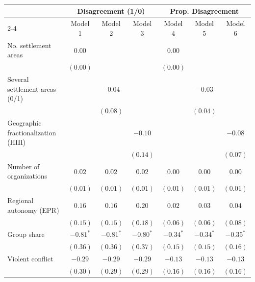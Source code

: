 
\begin{tabular}{l c c c c c c}
\hline
 & \multicolumn{3}{c}{Disagreement (1/0)} & \multicolumn{3}{c}{Prop. Disagreement} \\
\cline{2-4} \cline{5-7}
 & Model 1 & Model 2 & Model 3 & Model 4 & Model 5 & Model 6 \\
\hline
No. settlement areas               & $0.00$      &             &             & $0.00$      &             &             \\
                                   & $(0.00)$    &             &             & $(0.00)$    &             &             \\
Several settlement areas (0/1)     &             & $-0.04$     &             &             & $-0.03$     &             \\
                                   &             & $(0.08)$    &             &             & $(0.04)$    &             \\
Geographic fractionalization (HHI) &             &             & $-0.10$     &             &             & $-0.08$     \\
                                   &             &             & $(0.14)$    &             &             & $(0.07)$    \\
Number of organizations            & $0.02$      & $0.02$      & $0.02$      & $0.00$      & $0.00$      & $0.00$      \\
                                   & $(0.01)$    & $(0.01)$    & $(0.01)$    & $(0.01)$    & $(0.01)$    & $(0.01)$    \\
Regional autonomy (EPR)            & $0.16$      & $0.16$      & $0.20$      & $0.02$      & $0.03$      & $0.04$      \\
                                   & $(0.15)$    & $(0.15)$    & $(0.18)$    & $(0.06)$    & $(0.06)$    & $(0.08)$    \\
Group share                        & $-0.81^{*}$ & $-0.81^{*}$ & $-0.80^{*}$ & $-0.34^{*}$ & $-0.34^{*}$ & $-0.35^{*}$ \\
                                   & $(0.36)$    & $(0.36)$    & $(0.37)$    & $(0.15)$    & $(0.15)$    & $(0.16)$    \\
Violent conflict                   & $-0.29$     & $-0.29$     & $-0.29$     & $-0.13$     & $-0.13$     & $-0.13$     \\
                                   & $(0.30)$    & $(0.29)$    & $(0.29)$    & $(0.16)$    & $(0.16)$    & $(0.16)$    \\

\end{tabular}
